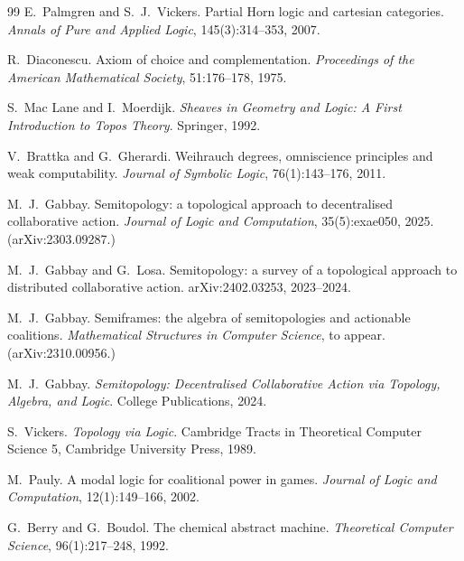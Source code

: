 \documentclass[11pt]{article}
\theoremstyle{definition}
\theoremstyle{plain}
\begin{document}
\begin{thebibliography}{99}
 E.\ Palmgren and S.~J.\ Vickers. Partial Horn
logic and cartesian categories. \emph{Annals of Pure and Applied Logic},
145(3):314--353, 2007.

 R.\ Diaconescu. Axiom of choice and complementation.
\emph{Proceedings of the American Mathematical Society}, 51:176--178, 1975.

 S.\ Mac Lane and I.\ Moerdijk. \emph{Sheaves in
Geometry and Logic: A First Introduction to Topos Theory}. Springer, 1992.

 V.\ Brattka and G.\ Gherardi. Weihrauch degrees,
omniscience principles and weak computability. \emph{Journal of Symbolic
Logic}, 76(1):143--176, 2011.

 M.\ J.\ Gabbay. Semitopology: a topological approach to
decentralised collaborative action. \emph{Journal of Logic and Computation},
35(5):exae050, 2025. (arXiv:2303.09287.)

 M.\ J.\ Gabbay and G.\ Losa. Semitopology: a survey of
a topological approach to distributed collaborative action.
arXiv:2402.03253, 2023--2024.

 M.\ J.\ Gabbay. Semiframes: the algebra of
semitopologies and actionable coalitions. \emph{Mathematical Structures in
Computer Science}, to appear. (arXiv:2310.00956.)

 M.\ J.\ Gabbay. \emph{Semitopology: Decentralised
Collaborative Action via Topology, Algebra, and Logic}. College Publications,
2024.

 S.\ Vickers. \emph{Topology via Logic}. Cambridge Tracts
in Theoretical Computer Science 5, Cambridge University Press, 1989.

 M.\ Pauly. A modal logic for coalitional power in games.
\emph{Journal of Logic and Computation}, 12(1):149--166, 2002.

 G.\ Berry and G.\ Boudol. The chemical abstract
machine. \emph{Theoretical Computer Science}, 96(1):217--248, 1992.

\end{thebibliography}
\end{document}
